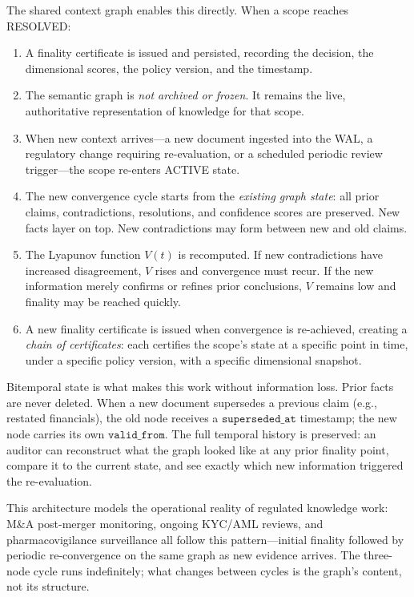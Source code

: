\documentclass[11pt]{article}
\begin{document}
The shared context graph enables this directly. When a scope reaches RESOLVED:

\begin{enumerate}
  \item A finality certificate is issued and persisted, recording the decision, the dimensional scores, the policy version, and the timestamp.
  \item The semantic graph is \emph{not archived or frozen}. It remains the live, authoritative representation of knowledge for that scope.
  \item When new context arrives---a new document ingested into the WAL, a regulatory change requiring re-evaluation, or a scheduled periodic review trigger---the scope re-enters ACTIVE state.
  \item The new convergence cycle starts from the \emph{existing graph state}: all prior claims, contradictions, resolutions, and confidence scores are preserved. New facts layer on top. New contradictions may form between new and old claims.
  \item The Lyapunov function $V(t)$ is recomputed. If new contradictions have increased disagreement, $V$ rises and convergence must recur. If the new information merely confirms or refines prior conclusions, $V$ remains low and finality may be reached quickly.
  \item A new finality certificate is issued when convergence is re-achieved, creating a \emph{chain of certificates}: each certifies the scope's state at a specific point in time, under a specific policy version, with a specific dimensional snapshot.
\end{enumerate}

Bitemporal state is what makes this work without information loss. Prior facts are never deleted. When a new document supersedes a previous claim (e.g., restated financials), the old node receives a $\texttt{superseded\_at}$ timestamp; the new node carries its own $\texttt{valid\_from}$. The full temporal history is preserved: an auditor can reconstruct what the graph looked like at any prior finality point, compare it to the current state, and see exactly which new information triggered the re-evaluation.

This architecture models the operational reality of regulated knowledge work: M\&A post-merger monitoring, ongoing KYC/AML reviews, and pharmacovigilance surveillance all follow this pattern---initial finality followed by periodic re-convergence on the same graph as new evidence arrives. The three-node cycle runs indefinitely; what changes between cycles is the graph's content, not its structure.
\end{document}
